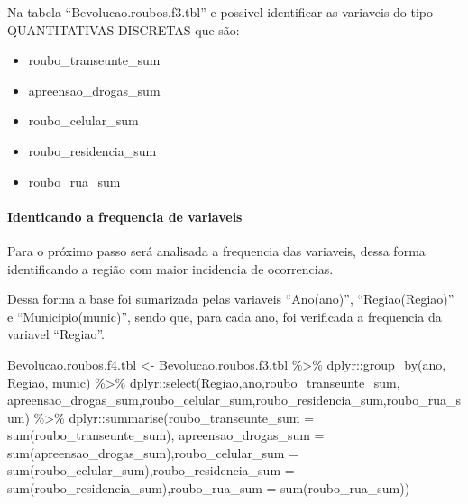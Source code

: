 \documentclass[
]{article}
\newenvironment{Shaded}{\begin{snugshade}}{\end{snugshade}}
\newcommand{\AttributeTok}[1]{\textcolor[rgb]{0.77,0.63,0.00}{#1}}
\newcommand{\FunctionTok}[1]{\textcolor[rgb]{0.00,0.00,0.00}{#1}}
\newcommand{\NormalTok}[1]{#1}
\newcommand{\OtherTok}[1]{\textcolor[rgb]{0.56,0.35,0.01}{#1}}
\newcommand{\SpecialCharTok}[1]{\textcolor[rgb]{0.00,0.00,0.00}{#1}}
\providecommand{\tightlist}{%
  \setlength{\itemsep}{0pt}\setlength{\parskip}{0pt}}
\begin{document}
Na tabela ``Bevolucao.roubos.f3.tbl'' e possivel identificar as variaveis do tipo QUANTITATIVAS DISCRETAS que são:

\begin{itemize}
\tightlist
\item
  roubo\_transeunte\_sum
\item
  apreensao\_drogas\_sum
\item
  roubo\_celular\_sum
\item
  roubo\_residencia\_sum
\item
  roubo\_rua\_sum
\end{itemize}

\hypertarget{identicando-a-frequencia-de-variaveis}{%
\paragraph{Identicando a frequencia de variaveis}\label{identicando-a-frequencia-de-variaveis}}

Para o próximo passo será analisada a frequencia das variaveis, dessa forma identificando a região com maior incidencia de ocorrencias.

Dessa forma a base foi sumarizada pelas variaveis ``Ano(ano)'', ``Regiao(Regiao)'' e ``Municipio(munic)'', sendo que, para cada ano, foi verificada a frequencia da variavel ``Regiao''.

\begin{Shaded}
\begin{Highlighting}[]
\NormalTok{Bevolucao.roubos.f4.tbl }\OtherTok{\textless{}{-}}\NormalTok{ Bevolucao.roubos.f3.tbl }\SpecialCharTok{\%\textgreater{}\%}\NormalTok{ dplyr}\SpecialCharTok{::}\FunctionTok{group\_by}\NormalTok{(ano, Regiao, munic) }\SpecialCharTok{\%\textgreater{}\%}\NormalTok{ dplyr}\SpecialCharTok{::}\FunctionTok{select}\NormalTok{(Regiao,ano,roubo\_transeunte\_sum, apreensao\_drogas\_sum,roubo\_celular\_sum,roubo\_residencia\_sum,roubo\_rua\_sum) }\SpecialCharTok{\%\textgreater{}\%}\NormalTok{ dplyr}\SpecialCharTok{::}\FunctionTok{summarise}\NormalTok{(}\AttributeTok{roubo\_transeunte\_sum =} \FunctionTok{sum}\NormalTok{(roubo\_transeunte\_sum), }\AttributeTok{apreensao\_drogas\_sum =} \FunctionTok{sum}\NormalTok{(apreensao\_drogas\_sum),}\AttributeTok{roubo\_celular\_sum =} \FunctionTok{sum}\NormalTok{(roubo\_celular\_sum),}\AttributeTok{roubo\_residencia\_sum =} \FunctionTok{sum}\NormalTok{(roubo\_residencia\_sum),}\AttributeTok{roubo\_rua\_sum =} \FunctionTok{sum}\NormalTok{(roubo\_rua\_sum))}
\end{Highlighting}
\end{Shaded}
\end{document}
